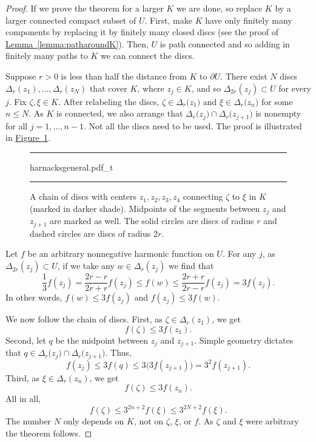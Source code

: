 \documentclass[12pt,openany]{book}
\theoremstyle{plain}
\theoremstyle{remark}
\theoremstyle{definition}
\newenvironment{myfig}{%
\begin{figure}[h!t]
\noindent\rule{\textwidth}{0.5pt}\vspace{12pt}\par\centering}%
{\par\noindent\rule{\textwidth}{0.5pt}
\end{figure}}
\theoremstyle{exercise}
\theoremstyle{example}
\newcommand{\figureref}[1]{\hyperref[#1]{Figure~\ref*{#1}}}
\newcommand{\lemmaref}[1]{\hyperref[#1]{Lemma~\ref*{#1}}}
\begin{document}
\begin{proof}
If we prove the theorem for a larger $K$ we are done, so replace $K$
by a larger connected compact subset of $U$.
First, make $K$ have only finitely many components by replacing it
by finitely many closed discs
(see the proof of \lemmaref{lemma:patharoundK}).  Then, $U$ is path
connected and so adding in finitely many paths to $K$ we can connect
the discs.

Suppose $r> 0$ is less than half the distance from $K$ to $\partial U$.
There exist $N$ discs $\Delta_{r}(z_1),\ldots,\Delta_{r}(z_N)$ that cover $K$,
where $z_j \in K$, and so $\Delta_{2r}(z_j) \subset U$ for every $j$.
Fix $\zeta,\xi \in K$.  After relabeling the discs,
$\zeta \in \Delta_{r}\bigl(z_{1}\bigr)$
and
$\xi \in \Delta_{r}\bigl(z_{n}\bigr)$ for some $n \leq N$.
As $K$ is connected, we also arrange that
$\Delta_{r}\bigl(z_{j}\bigr) \cap \Delta_{r}\bigl(z_{j+1}\bigr)$
is nonempty for all $j=1,\ldots,n-1$.
Not all the discs need to be used.
The proof is illustrated in \figureref{fig:harnacksgeneral}.

\begin{myfig}
{harnacksgeneral.pdf_t}
\caption{A chain of discs with centers $z_1,z_2,z_3,z_4$ connecting
$\zeta$ to $\xi$ in $K$ (marked in darker shade).  Midpoints of the segments
between $z_j$ and $z_{j+1}$ are marked as well.
The solid circles are discs of radius $r$ and
dashed circles are discs of radius $2r$.\label{fig:harnacksgeneral}}
\end{myfig}

Let $f$ be an arbitrary nonnegative harmonic function on $U$.
For any $j$, as $\Delta_{2r}(z_j) \subset U$, if we take any $w \in
\Delta_r(z_j)$ we find that 
\begin{equation*}
\frac{1}{3} f(z_j) = 
\frac{2r-r}{2r+r} f(z_j)
\leq
f(w)
\leq \frac{2r+r}{2r-r} f(z_j)
= 3 f(z_j) .
\end{equation*}
In other words, $f(w) \leq 3 f(z_j)$ and $f(z_j) \leq 3 f(w)$.

We now follow the chain of discs.
First, as $\zeta \in \Delta_r(z_1)$, we get 
\begin{equation*}
f(\zeta) \leq 3 f(z_1).
\end{equation*}
Second, let
$q$ be the midpoint between $z_{j}$ and $z_{j+1}$.
Simple geometry dictates that
$q \in \Delta_{r}\bigl(z_{j}\bigr) \cap \Delta_{r}\bigl(z_{j+1}\bigr)$.
Thus,
\begin{equation*}
f(z_j) \leq 3 f(q) \leq 3 \bigl( 3 f(z_{j+1}) \bigr) = 3^2 f(z_{j+1}).
\end{equation*}
Third, as $\xi \in \Delta_r(z_n)$, we get 
\begin{equation*}
f(\zeta) \leq 3 f(z_n).
\end{equation*}
All in all,
\begin{equation*}
f(\zeta) \leq
3^{2n+2}
f(\xi)
\leq
3^{2N+2}
f(\xi) .
\end{equation*}
The number $N$ only depends on $K$, not on $\zeta$, $\xi$, or $f$.
As $\zeta$ and $\xi$ were arbitrary the theorem follows.
\end{proof}
\end{document}
